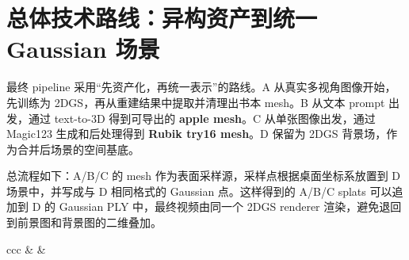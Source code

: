 \documentclass[UTF8,10pt,a4paper]{ctexart}
\let\latexcenter\center
\let\endlatexcenter\endcenter
\renewenvironment{center}{%
  \setlength{\topsep}{0.35em plus 0.08em minus 0.08em}%
  \setlength{\partopsep}{0pt}%
  \latexcenter
}{\endlatexcenter}
\begin{document}
\section{总体技术路线：异构资产到统一 Gaussian 场景}

最终 pipeline 采用“先资产化，再统一表示”的路线。A 从真实多视角图像开始，先训练为 2DGS，再从重建结果中提取并清理出书本 mesh。B 从文本 prompt 出发，通过 text-to-3D 得到可导出的 \textbf{apple mesh}。C 从单张图像出发，通过 Magic123 生成和后处理得到 \textbf{Rubik try16 mesh}。D 保留为 2DGS 背景场，作为合并后场景的空间基底。

总流程如下：A/B/C 的 mesh 作为表面采样源，采样点根据桌面坐标系放置到 D 场景中，并写成与 D 相同格式的 Gaussian 点。这样得到的 A/B/C splats 可以追加到 D 的 Gaussian PLY 中，最终视频由同一个 2DGS renderer 渲染，避免退回到前景图和背景图的二维叠加。

\begin{center}
\centering
\small
\setlength{\tabcolsep}{6pt}
\begin{tabular}{ccc}
&
&
\\[1.0em]
 \\
\\[-0.1em]
\end{tabular}
\label{fig:overall_pipeline_clean}
\end{center}
\end{document}
